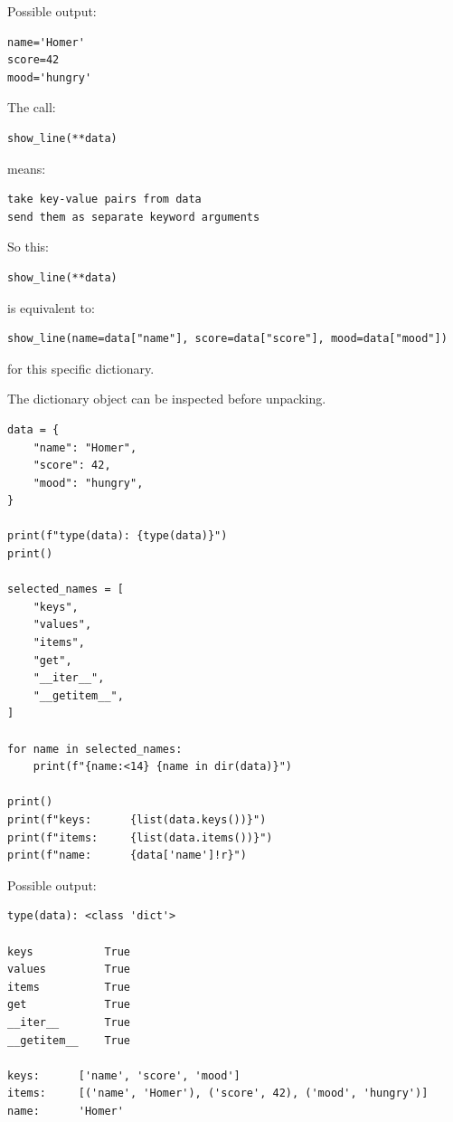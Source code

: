 Possible output:

\begin{verbatim}
name='Homer'
score=42
mood='hungry'
\end{verbatim}

The call:

\begin{verbatim}
show_line(**data)
\end{verbatim}

means:

\begin{verbatim}
take key-value pairs from data
send them as separate keyword arguments
\end{verbatim}

So this:

\begin{verbatim}
show_line(**data)
\end{verbatim}

is equivalent to:

\begin{verbatim}
show_line(name=data["name"], score=data["score"], mood=data["mood"])
\end{verbatim}

for this specific dictionary.

The dictionary object can be inspected before unpacking.

\begin{verbatim}
data = {
    "name": "Homer",
    "score": 42,
    "mood": "hungry",
}

print(f"type(data): {type(data)}")
print()

selected_names = [
    "keys",
    "values",
    "items",
    "get",
    "__iter__",
    "__getitem__",
]

for name in selected_names:
    print(f"{name:<14} {name in dir(data)}")

print()
print(f"keys:      {list(data.keys())}")
print(f"items:     {list(data.items())}")
print(f"name:      {data['name']!r}")
\end{verbatim}

Possible output:

\begin{verbatim}
type(data): <class 'dict'>

keys           True
values         True
items          True
get            True
__iter__       True
__getitem__    True

keys:      ['name', 'score', 'mood']
items:     [('name', 'Homer'), ('score', 42), ('mood', 'hungry')]
name:      'Homer'
\end{verbatim}

